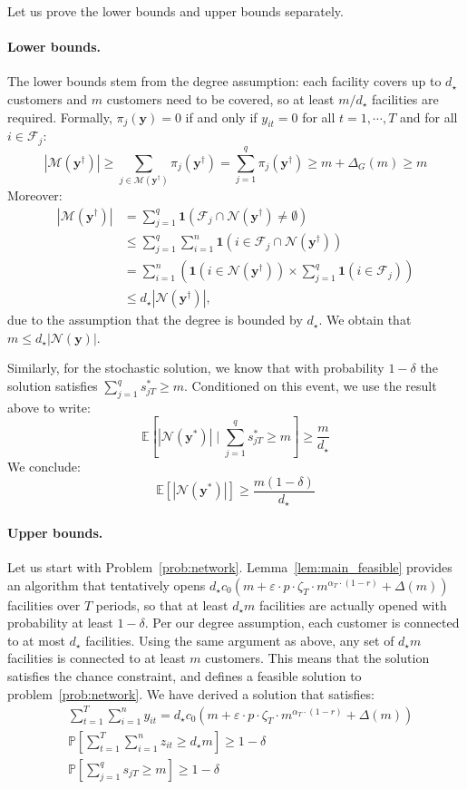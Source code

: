 \documentclass[nonblindrev]{informs3noheader}
\def\E{\mathbb{E}}
\def\P{\mathbb{P}}
\def\calF{\mathcal{F}}
\def\calM{\mathcal{M}}
\def\calN{\mathcal{N}}
\def\by{\boldsymbol{y}}
\def\bone{\boldsymbol{1}}
\begin{document}
 Let us prove the lower bounds and upper bounds separately.

\paragraph{Lower bounds.}

The lower bounds stem from the degree assumption: each facility covers up to $d_\star$ customers and $m$ customers need to be covered, so at least $m/d_\star$ facilities are required. Formally, $\pi_{j}(\by)=0$ if and only if $y_{it}=0$ for all $t=1,\cdots,T$ and for all $i\in\calF_j$:
$$|\calM(\by^\dagger)|\geq\sum_{j\in\calM(\by^\dagger)}\pi_{j}(\by^\dagger)=\sum_{j=1}^q \pi_{j}(\by^\dagger) \geq m+\Delta_G(m)\geq m$$
Moreover:
\begin{align*}
    |\calM(\by^\dagger)|
    &=\sum_{j=1}^q\bone(\calF_j\cap\calN(\by^\dagger)\neq\emptyset)\\
    &\leq \sum_{j=1}^q\sum_{i=1}^n\bone(i\in\calF_j\cap\calN(\by^\dagger))\\
    &=\sum_{i=1}^n\left(\bone\left(i\in\calN(\by^\dagger)\right)\times\sum_{j=1}^q\bone(i\in\calF_j)\right)\\
    &\leq d_\star|\calN(\by^\dagger)|,
\end{align*}
due to the assumption that the degree is bounded by $d_\star$. We obtain that
$m\leq d_\star|\calN(\by)|$.

Similarly, for the stochastic solution, we know that with probability $1-\delta$ the solution satisfies $\sum_{j=1}^q s^*_{jT} \geq m$. Conditioned on this event, we use the result above to write:
\[\E\left[|\calN(\by^*)| \mid \sum_{j=1}^q s^*_{jT} \geq m\right] \geq \frac{m}{d_\star}\]
We conclude:
\[\E[|\calN(\by^*)|] \geq \frac{m(1-\delta)}{d_\star}\]

\paragraph{Upper bounds.}

Let us start with Problem~\eqref{prob:network}. Lemma~\ref{lem:main_feasible} provides an algorithm that tentatively opens $d_\star c_0\left(m + \varepsilon\cdot p \cdot\zeta_T\cdot m^{\alpha_T\cdot(1-r)} + \Delta(m)\right)$ facilities over $T$ periods, so that at least $d_\star m$ facilities are actually opened with probability at least $1-\delta$. Per our degree assumption, each customer is connected to at most $d_\star$ facilities. Using the same argument as above, any set of $d_\star m$ facilities is connected to at least $m$ customers. This means that the solution satisfies the chance constraint, and defines a feasible solution to problem~\eqref{prob:network}. We have derived a solution that satisfies:
\begin{align*}
    &\sum_{t=1}^T \sum_{i=1}^n y_{it} =d_\star c_0 \left(m + \varepsilon\cdot p \cdot\zeta_T\cdot m^{\alpha_T\cdot(1-r)}+ \Delta(m)\right) \\
    & \P\left[\sum_{t=1}^T \sum_{i=1}^n z_{it} \geq d_\star m\right] \geq 1-\delta\\
    & \P\left[\sum_{j=1}^q s_{jT} \geq m\right] \geq 1-\delta
\end{align*}
\end{document}
